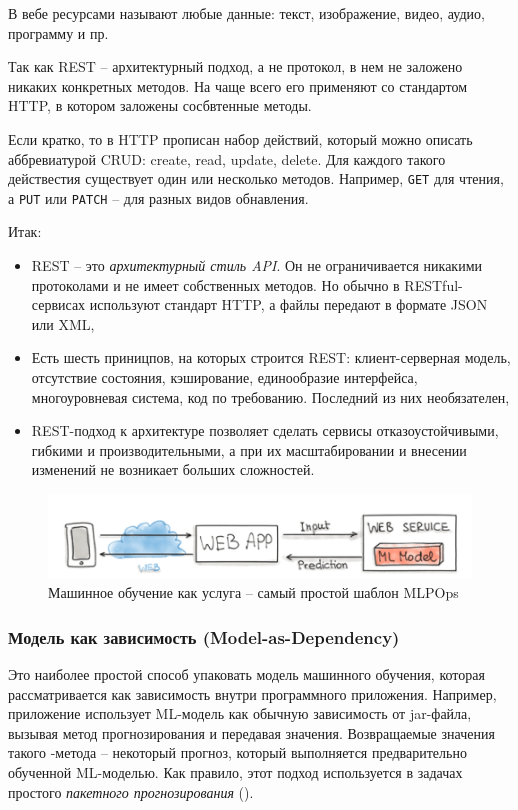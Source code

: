 \documentclass[%
	11pt,
	a4paper,
	utf8,
		]{article}
\begin{document}
В вебе ресурсами называют любые данные: текст, изображение, видео, аудио, программу и пр.

Так как REST -- архитектурный подход, а не протокол, в нем не заложено никаких конкретных методов. На чаще всего его применяют со стандартом HTTP, в котором заложены сосбвтенные методы.

Если кратко, то в HTTP прописан набор действий, который можно описать аббревиатурой CRUD: create, read, update, delete. Для каждого такого действестия существует один или несколько методов. Например, \verb|GET| для чтения, а \verb|PUT| или \verb|PATCH| -- для разных видов обнавления.

Итак:
\begin{itemize}
	\item REST -- это \emph{архитектурный стиль API}. Он не ограничивается никакими протоколами и не имеет собственных методов. Но обычно в RESTful-сервисах используют стандарт HTTP, а файлы передают в формате JSON или XML,
	
	\item Есть шесть приницпов, на которых строится REST: клиент-серверная модель, отсутствие состояния, кэширование, единообразие интерфейса, многоуровневая система, код по требованию. Последний из них необязателен,
	
	\item REST-подход к архитектуре позволяет сделать сервисы отказоустойчивыми, гибкими и производительными, а при их масштабировании и внесении изменений не возникает больших сложностей.
\end{itemize}

\begin{figure}[h]
	\centering
	\includegraphics[scale=0.6]{figures/ml_as_service.png}
	\caption{ Машинное обучение как услуга -- самый простой шаблон MLPOps }\label{fig:ml_as_service}
\end{figure}

\subsubsection{Модель как зависимость (Model-as-Dependency)}

Это наиболее простой способ упаковать модель машинного обучения, которая рассматривается как зависимость внутри программного приложения. Например, приложение использует ML-модель как обычную зависимость от jar-файла, вызывая метод прогнозирования и передавая значения. Возвращаемые значения такого -метода -- некоторый прогноз, который выполняется предварительно обученной ML-моделью. Как правило, этот подход используется в задачах простого \emph{пакетного прогнозирования} ().
\end{document}
